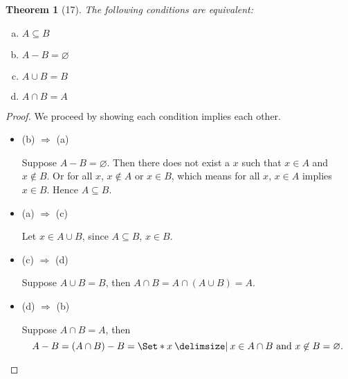\documentclass[12pt]{article}
\theoremstyle{plain}
\newtheorem*{exthm}{Theorem}
\theoremstyle{remark}
\theoremstyle{definition}
\theoremstyle{remark}
\providecommand\st{}
\newcommand\SetSymbol[1][]{%
  \nonscript\:#1\vert%
  \allowbreak%
  \nonscript\:
\mathopen{}}
\renewcommand\st{\SetSymbol[\delimsize]}
\begin{document}
\begin{exthm}[17]
  The following conditions are equivalent:
  \begin{multicols}{2}
    \begin{enumerate}[(a)]
      \item $A \subseteq B$
      \item $A - B = \varnothing$
      \item $A \cup B = B$
      \item $A \cap B = A$
    \end{enumerate}
  \end{multicols}
\end{exthm}
\begin{proof}
  We proceed by showing each condition implies each other.
  \begin{itemize}
    \item (b) $\Rightarrow$ (a)

      Suppose $A - B = \varnothing$. Then there does not exist a $x$ such that $x \in A$ and $x \not\in B$. Or for all $x$, $x \not\in A$ or $x \in B$, which means for all $x$, $x \in A$ implies $x \in B$. Hence $A \subseteq B$.
    \item (a) $\Rightarrow$ (c)

      Let $x \in A \cup B$, since $A \subseteq B$, $x \in B$.

    \item (c) $\Rightarrow$ (d)

      Suppose $A \cup B = B$, then $A \cap B = A \cap (A \cup B) = A$.

    \item (d) $\Rightarrow$ (b)

      Suppose $A \cap B = A$, then
      \[
        A - B = (A \cap B) - B = \Set*{x \st x \in A \cap B\ \text{and}\ x \not\in B} = \varnothing.
      \]

  \end{itemize}
\end{proof}
\end{document}
